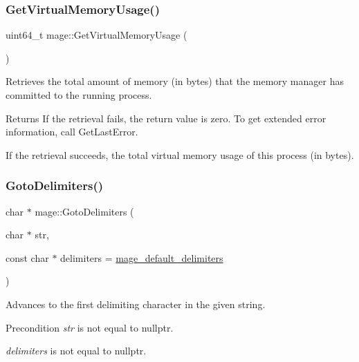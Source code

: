 \hypertarget{namespacemage_abc4bbe41e0b34bb80ff8994ec09bd2bf}{}\label{namespacemage_abc4bbe41e0b34bb80ff8994ec09bd2bf} 
\subsubsection{\texorpdfstring{Get\+Virtual\+Memory\+Usage()}{GetVirtualMemoryUsage()}}
{\footnotesize\ttfamily uint64\+\_\+t mage\+::\+Get\+Virtual\+Memory\+Usage (\begin{DoxyParamCaption}{ }\end{DoxyParamCaption})}

Retrieves the total amount of memory (in bytes) that the memory manager has committed to the running process.

\begin{DoxyReturn}{Returns}
If the retrieval fails, the return value is zero. To get extended error information, call Get\+Last\+Error. 

If the retrieval succeeds, the total virtual memory usage of this process (in bytes). 
\end{DoxyReturn}
\hypertarget{namespacemage_a1f8c73ddfbe8a370be1800627136b2ca}{}\label{namespacemage_a1f8c73ddfbe8a370be1800627136b2ca} 
\subsubsection{\texorpdfstring{Goto\+Delimiters()}{GotoDelimiters()}\hspace{0.1cm}{\footnotesize\ttfamily [1/2]}}
{\footnotesize\ttfamily char $\ast$ mage\+::\+Goto\+Delimiters (\begin{DoxyParamCaption}\item[{char $\ast$}]{str,  }\item[{const char $\ast$}]{delimiters = {\ttfamily \hyperlink{namespacemage_ae247ad66af37a4b0d67ddca9404ca01a}{mage\+\_\+default\+\_\+delimiters}} }\end{DoxyParamCaption})}

Advances to the first delimiting character in the given string.

\begin{DoxyPrecond}{Precondition}
{\itshape str} is not equal to {\ttfamily nullptr}. 

{\itshape delimiters} is not equal to {\ttfamily nullptr}. 
\end{DoxyPrecond}

